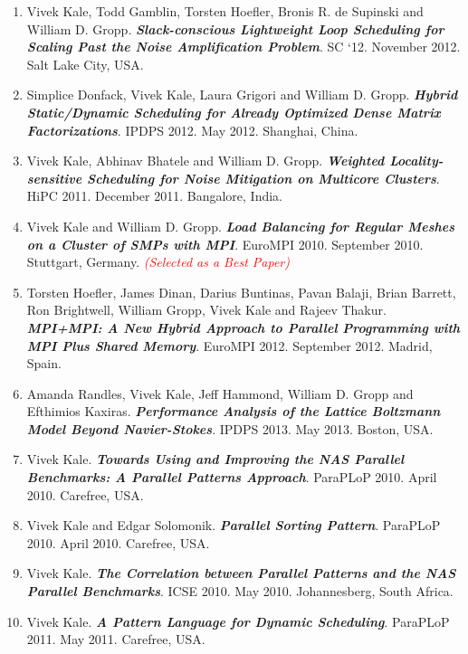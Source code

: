\begin{enumerate}
\item  Vivek Kale, Todd Gamblin, Torsten Hoefler, Bronis R. de
  Supinski and William D. Gropp. \textbf{\textit{Slack-conscious
      Lightweight Loop Scheduling for Scaling Past the Noise
      Amplification Problem}}. SC ‘12. November 2012. Salt Lake City, USA.

\item Simplice Donfack, Vivek Kale, Laura Grigori and William
  D. Gropp. \textbf{\textit{Hybrid Static/Dynamic Scheduling for
  Already Optimized Dense Matrix Factorizations}}. IPDPS
  2012. May 2012. Shanghai, China.

\item Vivek Kale, Abhinav Bhatele and William
  D. Gropp. \textbf{\textit{Weighted Locality-sensitive Scheduling for
      Noise Mitigation on Multicore Clusters}}. HiPC 2011. December
  2011. Bangalore, India. 

\item Vivek Kale and William D. Gropp. \textbf{\textit{Load Balancing
    for Regular Meshes on a Cluster of SMPs with
    MPI}}. EuroMPI 2010. September 2010. Stuttgart, Germany. \textit{\textcolor{red}{(Selected as a Best Paper)}}

\item Torsten Hoefler, James Dinan, Darius Buntinas, Pavan
  Balaji, Brian Barrett, Ron Brightwell, William Gropp, Vivek Kale and
  Rajeev Thakur. \textbf{\textit{MPI+MPI: A New Hybrid Approach to Parallel
    Programming with MPI Plus Shared Memory}}. EuroMPI 2012. September
  2012. Madrid, Spain.

\item Amanda Randles, Vivek Kale, Jeff Hammond, William D. Gropp and
Efthimios Kaxiras. \textbf{\textit{Performance Analysis of the Lattice
Boltzmann Model Beyond Navier-Stokes}}. IPDPS 2013. May 2013. Boston, USA.

\item Vivek Kale. \textbf{\textit{Towards Using and Improving the NAS
    Parallel Benchmarks: A Parallel Patterns Approach}}. ParaPLoP
  2010. April 2010. Carefree, USA.

\item Vivek Kale and Edgar Solomonik. \textbf{\textit{Parallel Sorting
    Pattern}}. ParaPLoP 2010. April 2010. Carefree, USA. 

\item Vivek Kale. \textbf{\textit{The Correlation between Parallel
    Patterns and the NAS Parallel Benchmarks}}. ICSE
  2010. May 2010. Johannesberg, South Africa.

\item Vivek Kale. \textbf{\textit{A Pattern Language for Dynamic
    Scheduling}}. ParaPLoP 2011. May 2011. Carefree, USA.


\end{enumerate} 

